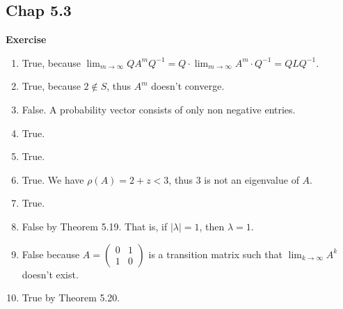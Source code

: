 \documentclass[12pt, a4paper]{article}
\theoremstyle{plain}
\newenvironment{exercise}[2][Exercise]
    { \begin{mdframed}[backgroundcolor=gray!20] \textbf{#1 #2} \\}
    {  \end{mdframed}}
\begin{document}
\subsection*{Chap 5.3}
\begin{exercise}{1}
\hfill

\begin{enumerate}[label=(\alph*)]
\item True, because $\lim_{m\rightarrow\infty}QA^mQ^{-1}=Q\cdot\lim_{m\rightarrow \infty}A^m\cdot Q^{-1}=QLQ^{-1}$.

\item True, because $2\notin S$, thus $A^m$ doesn't converge.

\item False. A probability vector consists of only non negative entries.

\item True.

\item True.

\item True. We have $\rho(A)=2+z<3$, thus $3$ is not an eigenvalue of $A$.

\item True.

\item False by Theorem 5.19. That is, if $|\lambda|=1$, then $\lambda =1$.

\item False because $A=\begin{pmatrix}
0&1\\
1&0
\end{pmatrix}$ is a transition matrix such that $\lim_{k\rightarrow \infty}A^k$ doesn't exist.

\item True by Theorem 5.20.
\end{enumerate}
\end{exercise}

\pagebreak
\end{document}

